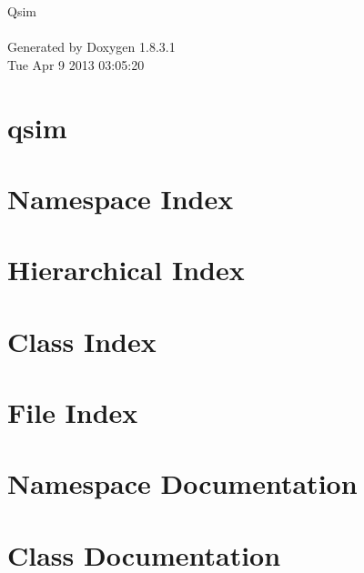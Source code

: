 \documentclass{book}
\begin{document}
\hypersetup{pageanchor=false,citecolor=blue}
\begin{titlepage}
\vspace*{7cm}
\begin{center}
{\Large Qsim \\[1ex]\large }\\
\vspace*{1cm}
{\large Generated by Doxygen 1.8.3.1}\\
\vspace*{0.5cm}
{\small Tue Apr 9 2013 03:05:20}\\
\end{center}
\end{titlepage}
\clearemptydoublepage
{}
\tableofcontents
\clearemptydoublepage
{}
\hypersetup{pageanchor=true,citecolor=blue}
\chapter{qsim}
\label{md_README}
\hypertarget{md_README}{}

\chapter{Namespace Index}

\chapter{Hierarchical Index}

\chapter{Class Index}

\chapter{File Index}

\chapter{Namespace Documentation}
















\chapter{Class Documentation}











\end{document}

